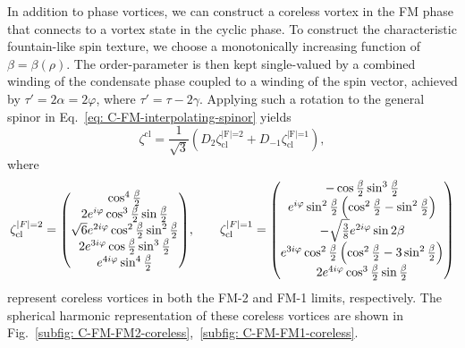 In addition to phase vortices, we can construct a coreless vortex in the FM
phase that connects to a vortex state in the cyclic phase.
To construct the characteristic fountain-like spin texture, we choose a
monotonically increasing function of \(\beta=\beta(\rho)\).
The order-parameter is then kept single-valued by a combined winding of the
condensate phase coupled to a winding of the spin vector, achieved by
\(\tau'=2\alpha=2\varphi \), where \(\tau'=\tau-2\gamma \).
Applying such a rotation to the general spinor in
Eq.~\eqref{eq: C-FM-interpolating-spinor} yields
\begin{equation}\label{eq: C-FM-coreless-general}
    \zeta^\text{cl} = \frac{1}{\sqrt{3}}\left(D_2\zeta^\text{|F|=2}_\text{cl}
    + D_{-1}\zeta^\text{|F|=1}_\text{cl}\right),
\end{equation}
where
\begin{equation}\label{eq: C-FM-coreless-FM-limits}
    \zeta^{|F|=2}_\text{cl} =
    \mqty(
    \cos^4\frac{\beta}{2} \\
    2e^{i\varphi}\cos^3\frac{\beta}{2}\sin\frac{\beta}{2} \\
    \sqrt{6}e^{2i\varphi}\cos^2\frac{\beta}{2}\sin^2\frac{\beta}{2} \\
    2e^{3i\varphi}\cos\frac{\beta}{2}\sin^3\frac{\beta}{2} \\
    e^{4i\varphi}\sin^4\frac{\beta}{2}
    ), \qquad
    \zeta^{|F|=1}_\text{cl} =
    \mqty(
    -\cos\frac{\beta}{2}\sin^3\frac{\beta}{2} \\
    e^{i\varphi}\sin^2\frac{\beta}{2}\left(\cos^2\frac{\beta}{2}
    -\sin^2\frac{\beta}{2}\right) \\
    -\sqrt{\frac{3}{8}}e^{2i\varphi}\sin2\beta \\
    e^{3i\varphi}\cos^2\frac{\beta}{2}\left(\cos^2\frac{\beta}{2}
    -3\sin^2\frac{\beta}{2}\right) \\
    2e^{4i\varphi}\cos^3\frac{\beta}{2}\sin\frac{\beta}{2}
    )
\end{equation}
represent coreless vortices in both the FM-2 and FM-1 limits, respectively.
The spherical harmonic representation of these coreless vortices are shown
in Fig.~\ref{subfig: C-FM-FM2-coreless},~\ref{subfig: C-FM-FM1-coreless}.
